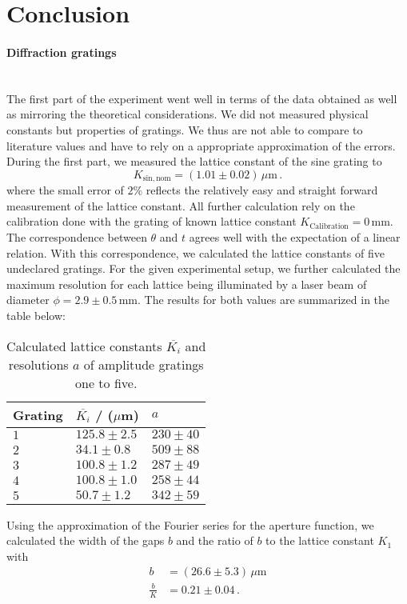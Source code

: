 \FloatBarrier
\clearpage
\section{Conclusion}
\paragraph{Diffraction gratings}~\\
The first part of the experiment went well in terms of the data obtained as well 
as mirroring the theoretical considerations. We did not measured 
physical constants but properties of gratings. We thus are not able to compare to 
literature values and have to rely on a appropriate approximation of the errors.
During the first part, 
we measured the lattice constant of the sine grating to 
\begin{equation}
    K_\mathrm{sin, nom} =(1.01 \pm 0.02) \, \mu\mathrm{m} \,.
\end{equation}
where the small error of $2\%$ reflects the relatively easy 
and straight forward measurement of the lattice constant. 
All further calculation rely on the calibration done with the 
grating of known lattice constant $K_\mathrm{Calibration} = 0\,$mm.
The correspondence between $\theta$ and $t$ agrees well 
with the expectation of a linear relation. 
With this correspondence, we calculated the lattice constants of five 
undeclared gratings. For the given experimental setup, we further calculated 
the maximum resolution for each lattice being illuminated by a laser beam of 
diameter $\phi = 2.9 \pm 0.5\,$mm.
The results for both values are summarized in the table below:
\begin{table}[H]
    \centering
	\begin{tabular}{|p{3.82cm}|p{3.82cm}|p{3.82cm}|}
		\hline
		\rowcolor{tabcolor}
        Grating & $\overline{K_i}$ / ($\mu$m) & $a$ \\ \hline
        $1$  & $ 125.8 \pm 2.5  $ & $ 230 \pm 40 $ \\
		$2$  & $ 34.1 \pm 0.8   $ & $ 509 \pm 88 $ \\
		$3$  & $ 100.8 \pm 1.2  $ & $ 287 \pm 49 $ \\
		$4$  & $ 100.8 \pm 1.0  $ & $ 258 \pm 44 $ \\
		$5$  & $ 50.7 \pm 1.2   $ & $ 342 \pm 59 $ \\
		\hline
	\end{tabular}
    \caption{
        Calculated lattice constants $\overline{K_i}$ and 
        resolutions $a$ of amplitude gratings one to five. 
        }
    \label{tab:gratings_K_conc}
\end{table}
Using the approximation of the Fourier series for the aperture function, 
we calculated the width of the gaps $b$ and the ratio of $b$ to the 
lattice constant $K_1$ with
\begin{align}
    b &= (26.6 \pm 5.3)\, \mu\mathrm{m} \\
    \frac{b}{K} &= 0.21 \pm 0.04  \, .
\end{align}

